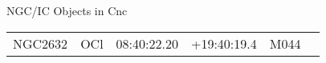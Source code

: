 \begin{block}{NGC/IC Objects in Cnc}
  \centering
  \begin{tabularx}{\textwidth}{llrrll} \toprule 
    NGC2632 & OCl & 08:40:22.20 & +19:40:19.4  & M044 \\ 
  \end{tabularx}
\end{block}